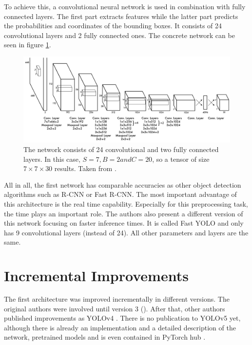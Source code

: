 To achieve this, a convolutional neural network is used in combination with fully connected layers. The first part extracts features while the latter part predicts the probabilities and coordinates of the bounding boxes. It consists of 24 convolutional layers and 2 fully connected ones. The concrete network can be seen in figure \ref{fig:YOLO_network}. \\


\begin{figure}[htb!]
	\centering
	\includegraphics[scale=0.25]{figures/YOLO_network.png}
	\caption{The network consists of 24 convolutional and two fully connected layers. In this case, $ S = 7, B = 2 and C = 20 $, so a tensor of size $ 7 \times 7 \times 30 $ results. Taken from \cite{yolov1}.}
	\label{fig:YOLO_network}
\end{figure}

All in all, the first network has comparable accuracies as other object detection algorithms such as R-CNN or Fast R-CNN. The most important advantage of this architecture is the real time capability. Especially for this preprocessing task, the time plays an important role. The authors also present a different version of this network focusing on faster inference times. It is called Fast YOLO and only has 9 convolutional layers (instead of 24). All other parameters and layers are the same.

\section{Incremental Improvements}

The first architecture was improved incrementally in different versions. The original authors were involved until version 3 (\cite{yolov1, yolov2, yolov3}). After that, other authors published improvements as YOLOv4 \cite{yolov4}. There is no publication to YOLOv5 yet, although there is already an implementation \cite{yolov5} and a detailed description of the network, pretrained models and is even contained in PyTorch hub \cite{pytorch_hub_yolov5}. \\

